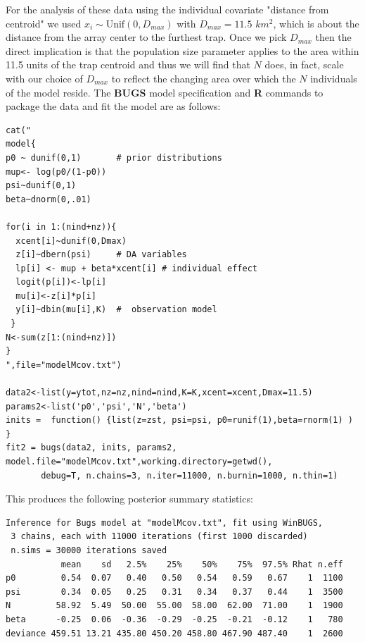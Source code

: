 For the analysis of these data using the individual covariate
"distance from centroid" we used $x_{i} \sim \mbox{Unif}(0,D_{max})$
with $D_{max} = 11.5$ $km^2$, which is about the distance from the
array center to the furthest trap.  Once we pick $D_{max}$ then the
direct implication is that the population size parameter applies to
the area within 11.5 units of the trap centroid and thus we will find
that $N$ does, in fact, scale with our choice of $D_{max}$ to reflect
the changing area over which the $N$ individuals of the model reside.
The {\bf BUGS} model specification and {\bf R} commands to package the
data and fit the model are as follows:
{\small
\begin{verbatim}
cat("
model{
p0 ~ dunif(0,1)       # prior distributions
mup<- log(p0/(1-p0))
psi~dunif(0,1)
beta~dnorm(0,.01)

for(i in 1:(nind+nz)){
  xcent[i]~dunif(0,Dmax)
  z[i]~dbern(psi)     # DA variables
  lp[i] <- mup + beta*xcent[i] # individual effect
  logit(p[i])<-lp[i]
  mu[i]<-z[i]*p[i]
  y[i]~dbin(mu[i],K)  #  observation model
 }
N<-sum(z[1:(nind+nz)])
}
",file="modelMcov.txt")

data2<-list(y=ytot,nz=nz,nind=nind,K=K,xcent=xcent,Dmax=11.5)
params2<-list('p0','psi','N','beta')
inits =  function() {list(z=zst, psi=psi, p0=runif(1),beta=rnorm(1) ) }
fit2 = bugs(data2, inits, params2, model.file="modelMcov.txt",working.directory=getwd(),    
       debug=T, n.chains=3, n.iter=11000, n.burnin=1000, n.thin=1)
\end{verbatim}
}
This produces the following posterior summary statistics:
{\small
\begin{verbatim}
Inference for Bugs model at "modelMcov.txt", fit using WinBUGS,
 3 chains, each with 11000 iterations (first 1000 discarded)
 n.sims = 30000 iterations saved
           mean    sd   2.5%    25%    50%    75%  97.5% Rhat n.eff
p0         0.54  0.07   0.40   0.50   0.54   0.59   0.67    1  1100
psi        0.34  0.05   0.25   0.31   0.34   0.37   0.44    1  3500
N         58.92  5.49  50.00  55.00  58.00  62.00  71.00    1  1900
beta      -0.25  0.06  -0.36  -0.29  -0.25  -0.21  -0.12    1   780
deviance 459.51 13.21 435.80 450.20 458.80 467.90 487.40    1  2600
\end{verbatim}
}

